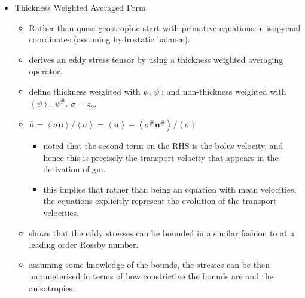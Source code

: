 \documentclass[10pt,a4paper]{article}
\newcommand*\thkmean[1]{\overline{#1}}
\newcommand*\thkres[1]{{#1}^{\prime}}
\newcommand*\nthkmean[1]{\left\langle{#1}\right\rangle}
\newcommand*\nthkres[1]{{#1}^{\#}}
\begin{document}
\begin{itemize}
                	\item Thickness Weighted Averaged Form
                	\begin{itemize}      
                		\item Rather than quasi-geostrophic start with primative equations in isopycnal coordinates (assuming hydrostatic balance).
                		\item \cite{young2012exact} derives an eddy stress tensor by
                		using a thickness weighted averaging operator.
                		\item define thickness weighted with $\thkmean{\psi}$, $\thkres{\psi}$;
                		and non-thickness weighted with $\nthkmean{\psi}$, $\nthkres{\psi}$. 
                		$\sigma = z_{\rho}$.
                		\item $\thkmean{\boldsymbol{u}}=\nthkmean{\sigma\boldsymbol{u}}/\nthkmean{\sigma}=\nthkmean{\boldsymbol{u}} + \nthkmean{\nthkres{\sigma}\nthkres{\boldsymbol{u}}}/\nthkmean{\sigma}$
                		\begin{itemize} 
                			\item \cite{young2012exact} noted that the second term on the RHS
                			 is the bolus velocity, and hence this is precisely the transport
                			  velocity that appears in the derivation of \gls{gm}.
                			\item this implies that rather than being an equation with mean
                			velocities, the equations explicitly represent the evolution of the
                			transport velocities.
                		\end{itemize}          
                		\item \cite{maddison2013eliassen} shows that the eddy stresses
                		can be bounded in a similar fashion to  \cite{marshall2012framework} 
                		at a leading order Rossby number.	
                		\item assuming some knowledge of the bounds, the stresses can
                		be then parameterised in terms of how constrictive the bounds are
                		and	the anisotropies.
                	\end{itemize}  
                	

\end{itemize}
\end{document}
